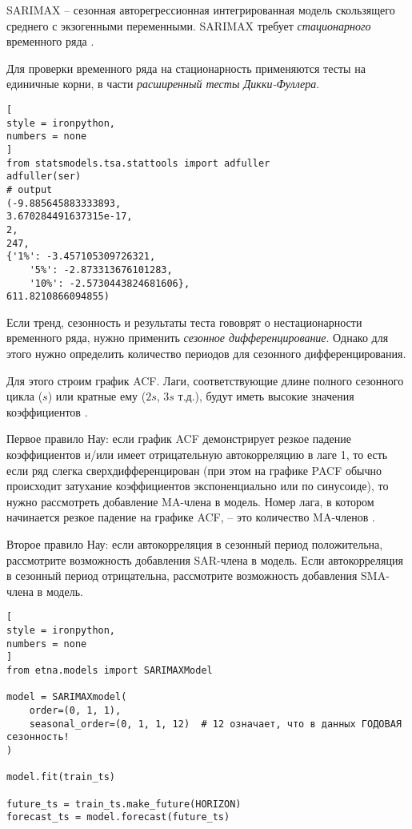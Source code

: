\documentclass[%
	11pt,
	a4paper,
	utf8,
		]{article}
\begin{document}
SARIMAX -- сезонная авторегрессионная интегрированная модель скользящего среднего с экзогенными переменными. SARIMAX требует \emph{стационарного} временного ряда \cite[]{gruzdev:time-series-2022}.

Для проверки временного ряда на стационарность применяются тесты на единичные корни, в части \emph{расширенный тесты Дикки-Фуллера}.
\begin{lstlisting}[
style = ironpython,
numbers = none	
]
from statsmodels.tsa.stattools import adfuller
adfuller(ser)
# output
(-9.885645883333893,
3.670284491637315e-17,
2,
247,
{'1%': -3.457105309726321,
	'5%': -2.873313676101283,
	'10%': -2.5730443824681606},
611.8210866094855)
\end{lstlisting}

Если тренд, сезонность и результаты теста гововрят о нестационарности временного ряда, нужно применить \emph{сезонное дифференцирование}. Однако для этого нужно определить количество периодов для сезонного дифференцирования.

Для этого строим график ACF. Лаги, соответствующие длине полного сезонного цикла ($s$) или кратные ему ($2s$, $3s$  т.д.), будут иметь высокие значения коэффициентов \cite[]{gruzdev:time-series-2022}.

Первое правило Нау: если график ACF демонстрирует резкое падение коэффициентов и/или имеет отрицательную автокорреляцию в лаге 1, то есть если ряд слегка сверхдифференцирован (при этом на графике PACF обычно происходит затухание коэффициентов экспоненциально или по синусоиде), то нужно рассмотреть добавление MA-члена в модель. Номер лага, в котором начинается резкое падение на графике ACF, -- это количество MA-членов \cite[]{gruzdev:time-series-2022}.

Второе правило Нау: если автокорреляция в сезонный период положительна, рассмотрите возможность добавления SAR-члена в модель. Если автокорреляция в сезонный период отрицательна, рассмотрите возможность добавления SMA-члена в модель.

\begin{lstlisting}[
style = ironpython,
numbers = none
]
from etna.models import SARIMAXModel

model = SARIMAXmodel(
    order=(0, 1, 1),
    seasonal_order=(0, 1, 1, 12)  # 12 означает, что в данных ГОДОВАЯ сезонность!
)

model.fit(train_ts)

future_ts = train_ts.make_future(HORIZON)
forecast_ts = model.forecast(future_ts)
\end{lstlisting}
\end{document}
